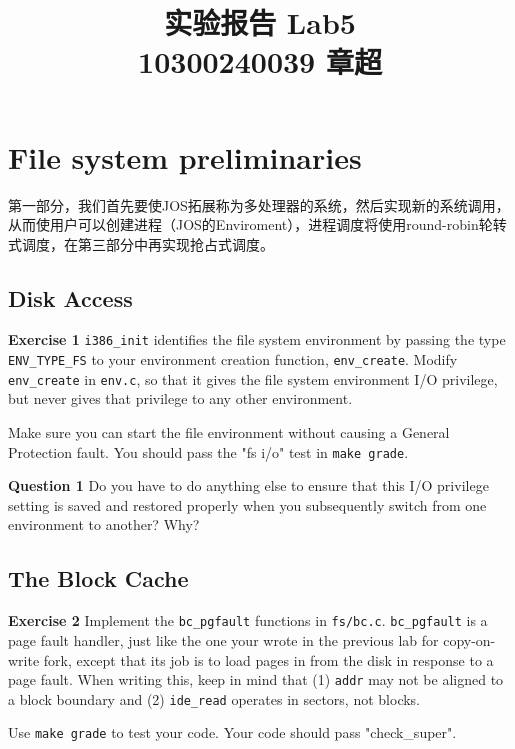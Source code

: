 \documentclass[11pt]{article}
\begin{document}
\title{\textbf{\huge{实验报告 Lab5}}\\
10300240039 章超}
\maketitle
\section{File system preliminaries}
第一部分，我们首先要使JOS拓展称为多处理器的系统，然后实现新的系统调用，从而使用户可以创建进程（JOS的Enviroment），进程调度将使用round-robin轮转式调度，在第三部分中再实现抢占式调度。
\subsection{Disk Access}

\begin{framed}
\noindent\textbf{Exercise 1} \lstinline|i386_init| identifies the file system environment by passing the type \lstinline|ENV_TYPE_FS| to your environment creation function, \lstinline|env_create|. Modify \lstinline|env_create| in \lstinline|env.c|, so that it gives the file system environment I/O privilege, but never gives that privilege to any other environment.

Make sure you can start the file environment without causing a General Protection fault. You should pass the "fs i/o" test in \lstinline|make grade|.
\end{framed}

\begin{framed}
\noindent\textbf{Question 1} Do you have to do anything else to ensure that this I/O privilege setting is saved and restored properly when you subsequently switch from one environment to another? Why?
\end{framed}

\subsection{The Block Cache}
\begin{framed}
\noindent\textbf{Exercise 2} Implement the \lstinline|bc_pgfault| functions in \lstinline|fs/bc.c|. \lstinline|bc_pgfault| is a page fault handler, just like the one your wrote in the previous lab for copy-on-write fork, except that its job is to load pages in from the disk in response to a page fault. When writing this, keep in mind that (1) \lstinline|addr| may not be aligned to a block boundary and (2) \lstinline|ide_read| operates in sectors, not blocks.

Use \lstinline|make grade| to test your code. Your code should pass "check_super".
\end{framed}
\end{document}

